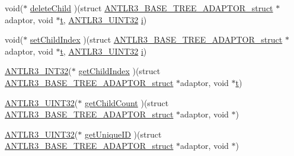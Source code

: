 \begin{DoxyCompactItemize}
\item 
void($\ast$ \hyperlink{struct_a_n_t_l_r3___b_a_s_e___t_r_e_e___a_d_a_p_t_o_r__struct_a18d77510ec9da77e91c161c661273f7b}{delete\-Child} )(struct \hyperlink{struct_a_n_t_l_r3___b_a_s_e___t_r_e_e___a_d_a_p_t_o_r__struct}{A\-N\-T\-L\-R3\-\_\-\-B\-A\-S\-E\-\_\-\-T\-R\-E\-E\-\_\-\-A\-D\-A\-P\-T\-O\-R\-\_\-struct} $\ast$adaptor, void $\ast$\hyperlink{showimage_8m_ad941f6ef920fbfb3d75b60ddbedbdd39}{t}, \hyperlink{antlr3defs_8h_ac41f744abd0fd25144b9eb9d11b1dfd1}{A\-N\-T\-L\-R3\-\_\-\-U\-I\-N\-T32} \hyperlink{_read_d_m3___matlab_8m_a6f6ccfcf58b31cb6412107d9d5281426}{i})
\item 
void($\ast$ \hyperlink{struct_a_n_t_l_r3___b_a_s_e___t_r_e_e___a_d_a_p_t_o_r__struct_aa3b3759087491473809ed2c0c865ff6e}{set\-Child\-Index} )(struct \hyperlink{struct_a_n_t_l_r3___b_a_s_e___t_r_e_e___a_d_a_p_t_o_r__struct}{A\-N\-T\-L\-R3\-\_\-\-B\-A\-S\-E\-\_\-\-T\-R\-E\-E\-\_\-\-A\-D\-A\-P\-T\-O\-R\-\_\-struct} $\ast$adaptor, void $\ast$\hyperlink{showimage_8m_ad941f6ef920fbfb3d75b60ddbedbdd39}{t}, \hyperlink{antlr3defs_8h_ac41f744abd0fd25144b9eb9d11b1dfd1}{A\-N\-T\-L\-R3\-\_\-\-U\-I\-N\-T32} \hyperlink{_read_d_m3___matlab_8m_a6f6ccfcf58b31cb6412107d9d5281426}{i})
\item 
\hyperlink{antlr3defs_8h_a6faef5c4687f8eb633d2aefea93973ca}{A\-N\-T\-L\-R3\-\_\-\-I\-N\-T32}($\ast$ \hyperlink{struct_a_n_t_l_r3___b_a_s_e___t_r_e_e___a_d_a_p_t_o_r__struct_a92d7a0368ed0698abff1e74d77363243}{get\-Child\-Index} )(struct \hyperlink{struct_a_n_t_l_r3___b_a_s_e___t_r_e_e___a_d_a_p_t_o_r__struct}{A\-N\-T\-L\-R3\-\_\-\-B\-A\-S\-E\-\_\-\-T\-R\-E\-E\-\_\-\-A\-D\-A\-P\-T\-O\-R\-\_\-struct} $\ast$adaptor, void $\ast$\hyperlink{showimage_8m_ad941f6ef920fbfb3d75b60ddbedbdd39}{t})
\item 
\hyperlink{antlr3defs_8h_ac41f744abd0fd25144b9eb9d11b1dfd1}{A\-N\-T\-L\-R3\-\_\-\-U\-I\-N\-T32}($\ast$ \hyperlink{struct_a_n_t_l_r3___b_a_s_e___t_r_e_e___a_d_a_p_t_o_r__struct_ad9bd810ce7e363dc9b1a142d8f81de05}{get\-Child\-Count} )(struct \hyperlink{struct_a_n_t_l_r3___b_a_s_e___t_r_e_e___a_d_a_p_t_o_r__struct}{A\-N\-T\-L\-R3\-\_\-\-B\-A\-S\-E\-\_\-\-T\-R\-E\-E\-\_\-\-A\-D\-A\-P\-T\-O\-R\-\_\-struct} $\ast$adaptor, void $\ast$)
\item 
\hyperlink{antlr3defs_8h_ac41f744abd0fd25144b9eb9d11b1dfd1}{A\-N\-T\-L\-R3\-\_\-\-U\-I\-N\-T32}($\ast$ \hyperlink{struct_a_n_t_l_r3___b_a_s_e___t_r_e_e___a_d_a_p_t_o_r__struct_a26aa832832b7ac9c3c70de5bde4711bc}{get\-Unique\-I\-D} )(struct \hyperlink{struct_a_n_t_l_r3___b_a_s_e___t_r_e_e___a_d_a_p_t_o_r__struct}{A\-N\-T\-L\-R3\-\_\-\-B\-A\-S\-E\-\_\-\-T\-R\-E\-E\-\_\-\-A\-D\-A\-P\-T\-O\-R\-\_\-struct} $\ast$adaptor, void $\ast$)

\end{DoxyCompactItemize}
